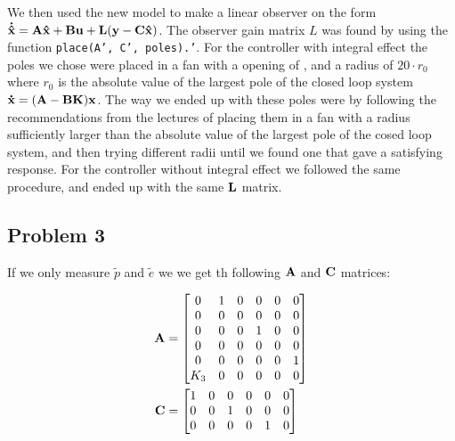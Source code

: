 We then used the new model to make a linear observer on the form $\mathbf{\dot{\hat x}} = \mathbf{A}\mathbf{\hat x} + \mathbf{B}\mathbf{u} + \mathbf{L} (\mathbf{y}-\mathbf{C}\mathbf{\hat x})$. The observer gain matrix $L$ was found by using the function \texttt{place(A', C', poles).'}. For the controller with integral effect the poles we chose were placed in a fan with a opening of , and a radius of $20 \cdot r_0$ where $r_0$ is the absolute value of the largest pole of the closed loop system $\mathbf{\dot x} = (\mathbf{A} - \mathbf{B} \mathbf{K}) \mathbf{x}$. The way we ended up with these poles were by following the recommendations from the lectures of placing them in a fan with a radius sufficiently larger than the absolute value of the largest pole of the cosed loop system, and then trying different radii until we found one that gave a satisfying response. For the controller without integral effect we followed the same procedure, and ended up with the same $\mathbf{L}$ matrix.  

\subsection{Problem 3}
If we only measure $\tilde p$ and $\tilde e$ we we get th following $\mathbf{A}$ and $\mathbf{C}$ matrices:

\begin{subequations}
	\begin{align}
		\mathbf{A} &= \begin{bmatrix}
			0 & 1 & 0 & 0 & 0 & 0\\
			0 & 0 & 0 & 0 & 0 & 0\\
			0 & 0 & 0 & 1 & 0 & 0\\
			0 & 0 & 0 & 0 & 0 & 0\\
			0 & 0 & 0 & 0 & 0 & 1\\
			K_3 & 0 & 0 & 0 & 0 & 0
		\end{bmatrix}\\
		\mathbf{C} &= \begin{bmatrix}
			1 & 0 & 0 & 0 & 0 & 0\\
			0 & 0 & 1 & 0 & 0 & 0\\
			0 & 0 & 0 & 0 & 1 & 0
		\end{bmatrix}
	\end{align}
\end{subequations}

